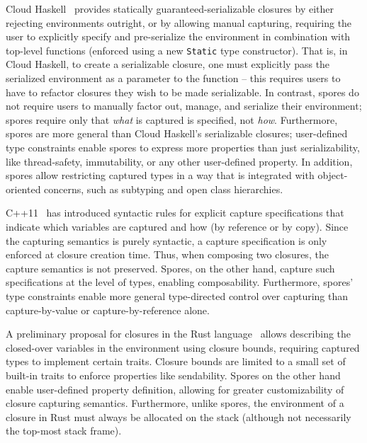 \documentclass[runningheads]{llncs}
\begin{document}
\begin{sloppypar}
Cloud Haskell~\cite{CloudHaskell} provides statically guaranteed-serializable
closures by either rejecting environments outright, or by allowing manual
capturing, requiring the user to explicitly specify and pre-serialize the
environment in combination with top-level functions (enforced using a new
\verb|Static| type constructor). That is, in Cloud Haskell, to create a
serializable closure, one must explicitly pass the serialized environment as a
parameter to the function -- this requires users to have to refactor closures
they wish to be made serializable. In contrast, spores
do not require users to manually factor out, manage, and serialize their
environment; spores require only that {\em what} is captured is specified, not
{\em how}. Furthermore, spores are more general than Cloud Haskell's
serializable closures; user-defined type constraints enable spores to
express more properties than just serializability, like thread-safety,
immutability, or any other user-defined property. In addition, spores allow
restricting captured types in a way that is integrated with object-oriented
concerns, such as subtyping and open class hierarchies.


C++11~\cite{CplusplusLambas} has introduced syntactic rules for explicit
capture specifications that indicate which variables are captured and how (by
reference or by copy). Since the capturing semantics is purely
syntactic, a capture specification is only enforced at closure creation time.
Thus, when composing two closures, the capture semantics is not preserved.
Spores, on the other hand, capture such specifications at the level of types,
enabling composability. Furthermore, spores' type constraints enable more
general type-directed control over capturing than capture-by-value or
capture-by-reference alone.

A preliminary proposal for closures in the Rust
language~\cite{RustFunctions} allows describing the closed-over variables
in the environment using closure bounds, requiring captured types to implement
certain traits. Closure bounds are limited to a small set of built-in
traits to enforce properties like sendability. Spores on the other hand enable
user-defined property definition, allowing for greater customizability of
closure capturing semantics. Furthermore, unlike spores, the environment of a
closure in Rust must always be allocated on the stack (although not necessarily the
top-most stack frame).


\end{sloppypar}
\end{document}
